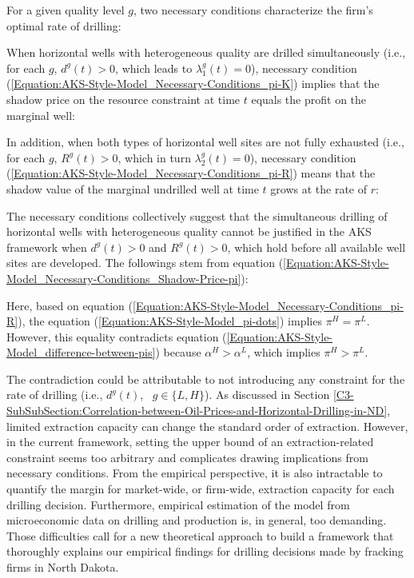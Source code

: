 For a given quality level $g$, two necessary conditions characterize the firm's optimal rate of drilling:

When horizontal wells with heterogeneous quality are drilled simultaneously (i.e., for each $g$, $d^{g}(t) >0$, which leads to $\lambda_{1}^{g}(t) = 0$), necessary condition (\ref{Equation:AKS-Style-Model_Necessary-Conditions_pi-K}) implies that the shadow price on the resource constraint at time $t$ equals the profit on the marginal well:

In addition, when both types of horizontal well sites are not fully exhausted (i.e., for each $g$, $R^{g}(t) > 0$, which in turn $\lambda_{2}^{g}(t) = 0$), necessary condition (\ref{Equation:AKS-Style-Model_Necessary-Conditions_pi-R}) means that the shadow value of the marginal undrilled well at time $t$ grows at the rate of $r$:


The necessary conditions collectively suggest that the simultaneous drilling of horizontal wells with heterogeneous quality cannot be justified in the AKS framework when $d^{g}(t) > 0$ and $R^{g}(t) > 0$, which hold before all available well sites are developed. The followings stem from equation (\ref{Equation:AKS-Style-Model_Necessary-Conditions_Shadow-Price-pi}):

Here, based on equation (\ref{Equation:AKS-Style-Model_Necessary-Conditions_pi-R}), the equation (\ref{Equation:AKS-Style-Model_pi-dots}) implies $\pi^{H} = \pi^{L}$. However, this equality contradicts equation (\ref{Equation:AKS-Style-Model_difference-between-pis}) because $\alpha^{H} > \alpha^{L}$, which implies $\pi^{H} > \pi^{L}$. 

The contradiction could be attributable to not introducing any constraint for the rate of drilling (i.e., $d^{g}(t)$, \ $g \in \{ L, H \}$). As discussed in Section \ref{C3-SubSubSection:Correlation-between-Oil-Prices-and-Horizontal-Drilling-in-ND}, limited extraction capacity can change the standard order of extraction. However, in the current framework, setting the upper bound of an extraction-related constraint seems too arbitrary and complicates drawing implications from necessary conditions. From the empirical perspective, it is also intractable to quantify the margin for market-wide, or firm-wide, extraction capacity for each drilling decision. Furthermore, empirical estimation of the model from microeconomic data on drilling and production is, in general, too demanding. Those difficulties call for a new theoretical approach to build a framework that thoroughly explains our empirical findings for drilling decisions made by fracking firms in North Dakota. 
